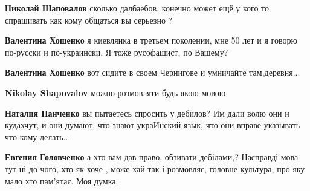 \begin{itemize}
\begin{itemize}
\textbf{Николай Шаповалов} сколько далбаебов, конечно может ещё у кого то спрашивать как кому общаться вы серьезно ?

 
\textbf{Валентина Хошенко} я киевлянка в третьем поколении, мне 50 лет и я говорю по-русски и по-украински. Я тоже русофашист, по Вашему?

 
\textbf{Валентина Хошенко} вот сидите в своем Чернигове и умничайте там,деревня...

 
\textbf{Nikolay Shapovalov} можно розмовляти будь якою мовою

 
\textbf{Наталия Панченко} вы пытаетесь спросить у дебилов? Им дали волю они и кудахчут, и они думают, что знают украИнский язык, что они вправе указывать что кому делать...

 
\textbf{Евгения Головченко} а хто вам дав право, обзивати дебілами,? Насправді мова тут ні до чого, хто як хоче , може хай так і розмовляє, головне культура, про яку мало хто пам'ятає. Моя думка.

 

\end{itemize}
\end{itemize}
